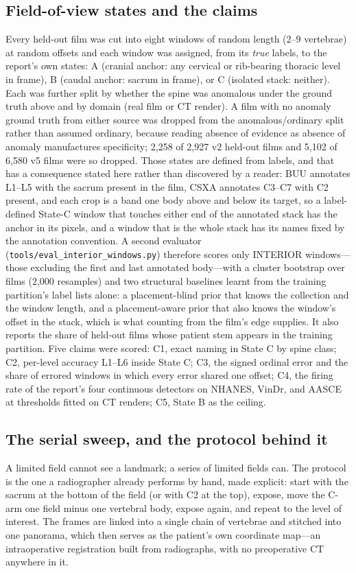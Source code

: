 \documentclass[11pt,letterpaper]{article}
\begin{document}
\subsection*{Field-of-view states and the claims}
Every held-out film was cut into eight windows of random length (2--9 vertebrae) at random offsets and each window was assigned, from its \emph{true} labels, to the report's own states: A (cranial anchor: any cervical or rib-bearing thoracic level in frame), B (caudal anchor: sacrum in frame), or C (isolated stack: neither). Each was further split by whether the spine was anomalous under the ground truth above and by domain (real film or CT render). A film with no anomaly ground truth from either source was dropped from the anomalous/ordinary split rather than assumed ordinary, because reading absence of evidence as absence of anomaly manufactures specificity; 2,258 of 2,927 v2 held-out films and 5,102 of 6,580 v5 films were so dropped. Those states are defined from labels, and that has a consequence stated here rather than discovered by a reader: BUU annotates L1--L5 with the sacrum present in the film, CSXA annotates C3--C7 with C2 present, and each crop is a band one body above and below its target, so a label-defined State-C window that touches either end of the annotated stack has the anchor in its pixels, and a window that is the whole stack has its names fixed by the annotation convention. A second evaluator (\texttt{tools/eval\_interior\_windows.py}) therefore scores only INTERIOR windows---those excluding the first and last annotated body---with a cluster bootstrap over films (2,000 resamples) and two structural baselines learnt from the training partition's label lists alone: a placement-blind prior that knows the collection and the window length, and a placement-aware prior that also knows the window's offset in the stack, which is what counting from the film's edge supplies. It also reports the share of held-out films whose patient stem appears in the training partition. Five claims were scored: C1, exact naming in State C by spine class; C2, per-level accuracy L1--L6 inside State C; C3, the signed ordinal error and the share of errored windows in which every error shared one offset; C4, the firing rate of the report's four continuous detectors on NHANES, VinDr, and AASCE \citep{aasce} at thresholds fitted on CT renders; C5, State B as the ceiling.

\subsection*{The serial sweep, and the protocol behind it}
A limited field cannot see a landmark; a series of limited fields can. The protocol is the one a radiographer already performs by hand, made explicit: start with the sacrum at the bottom of the field (or with C2 at the top), expose, move the C-arm one field minus one vertebral body, expose again, and repeat to the level of interest. The frames are linked into a single chain of vertebrae and stitched into one panorama, which then serves as the patient's own coordinate map---an intraoperative registration built from radiographs, with no preoperative CT anywhere in it.
\end{document}
